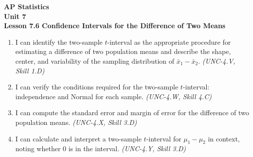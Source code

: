 \documentclass[10pt]{article}
\begin{document}
\vspace{-0.8in}

\begin{center}
  {\color{white}\textbf{\LARGE AP Statistics}}\\[4pt]
  {\color{skymid}\large\textbf{Unit 7}}\\[6pt]
  {\color{white}\textbf{\large Lesson 7.6 \quad Confidence Intervals for the Difference of Two Means}}
\end{center}

\vspace{0.22in}
\namedateperiod
\vspace{0.18in}

\begin{learningtargetbox}
\small
\begin{enumerate}[leftmargin=1.5em, itemsep=5pt]
  \item I can identify the two-sample $t$-interval as the appropriate procedure for
        estimating a difference of two population means and describe the shape, center,
        and variability of the sampling distribution of $\bar x_1 - \bar x_2$.
        \textit{(UNC-4.V, Skill 1.D)}
  \item I can verify the conditions required for the two-sample $t$-interval:
        independence and Normal for each sample.
        \textit{(UNC-4.W, Skill 4.C)}
  \item I can compute the standard error and margin of error for the difference of
        two population means.
        \textit{(UNC-4.X, Skill 3.D)}
  \item I can calculate and interpret a two-sample $t$-interval for $\mu_1 - \mu_2$
        in context, noting whether 0 is in the interval.
        \textit{(UNC-4.Y, Skill 3.D)}
\end{enumerate}
\end{learningtargetbox}

\vspace{0.14in}
\end{document}
